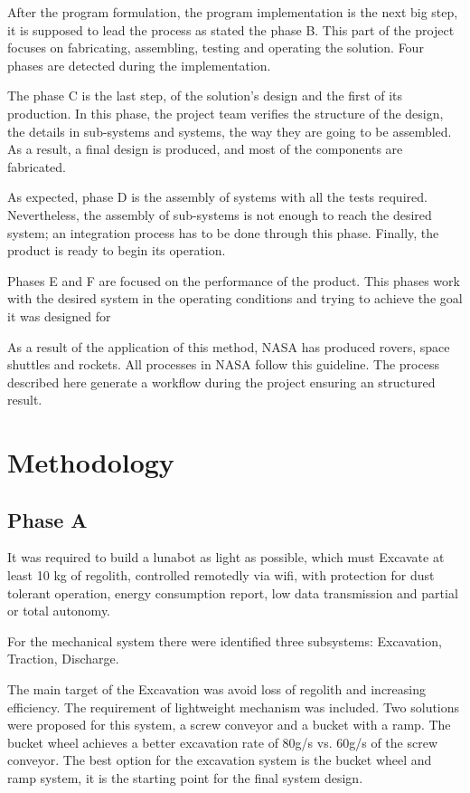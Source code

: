\documentclass[conference]{IEEEtran}
\begin{document}
After the program formulation, the program implementation is the next big step, it is supposed to lead the process as stated the phase B. This part of the project focuses on fabricating, assembling, testing and operating the solution. Four phases are detected during the implementation.

The phase C is the last step, of the solution's design and the first of its production. In this phase, the project team verifies the structure of the design, the details in sub-systems and systems, the way they are going to be assembled. As a result, a final design is produced, and most of the components are fabricated.

As expected, phase D is the assembly of systems with all the tests required. Nevertheless, the assembly of sub-systems is not enough to reach the desired system; an integration process has to be done through this phase. Finally, 	the product is ready to begin its operation.

Phases E and F are focused on the performance of the product. This phases work with the desired system in the operating conditions and trying to achieve the goal it was designed for

As a result of the application of this method, NASA has produced rovers, space shuttles and rockets. All processes in NASA follow this guideline. The process described here generate a workflow during the project ensuring an structured result.


\section{Methodology}

\subsection{Phase A}
It was required to build a lunabot as light as possible, which must Excavate at least 10 kg of regolith, controlled remotedly via wifi, with protection for dust tolerant operation, energy consumption report, low data transmission and partial or total autonomy. 

For the mechanical system there were identified three subsystems: Excavation, Traction, Discharge.

The main target of the  Excavation  was avoid loss of regolith and increasing efficiency. The requirement of lightweight mechanism was included.  Two solutions were proposed for this system, a screw conveyor and a bucket with a ramp. The bucket wheel achieves a better excavation rate of 80g/s vs. 60g/s of the screw conveyor. The best option for the excavation system is the bucket wheel and ramp system, it is the starting point for the final system design. 
\end{document}
